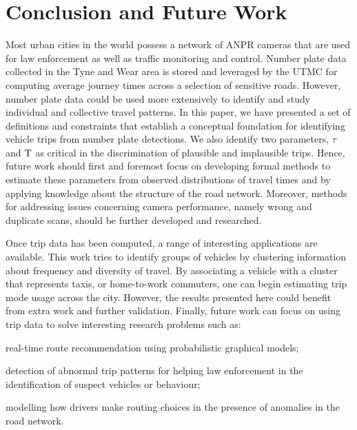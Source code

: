 \section{Conclusion and Future Work}\label{s.conclusions}

Most urban cities in the world possess a network of ANPR cameras that are used for law enforcement as well as traffic monitoring and control. Number plate data collected in the Tyne and Wear area is stored and leveraged by the UTMC for computing average journey times across a selection of sensitive roads. However, number plate data could be used more extensively to identify and study individual and collective travel patterns. In this paper, we have presented a set of definitions and constraints that establish a conceptual foundation for identifying vehicle trips from number plate detections. We also identify two parameters, $\tau$ and $\mathrm{T}$ as critical in the discrimination of plausible and implausible trips. Hence, future work should first and foremost focus on developing formal methods to estimate these parameters from observed distributions of travel times and by applying knowledge about the structure of the road network. Moreover, methods for addressing issues concerning camera performance, namely wrong and duplicate scans, should be further developed and researched.

Once trip data has been computed, a range of interesting applications are available. This work tries to identify groups of vehicles by clustering information about frequency and diversity of travel. By associating a vehicle with a cluster that represents taxis, or home-to-work commuters, one can begin estimating trip mode usage across the city. However, the results presented here could benefit from extra work and further validation. Finally, future work can focus on using trip data to solve interesting research problems such as:
\begin{enumerate*}[label=(\roman*)]
  \item real-time route recommendation using probabilistic graphical models;
  \item detection of abnormal trip patterns for helping law enforcement in the identification of suspect vehicles or behaviour;
  \item modelling how drivers make routing choices in the presence of anomalies in the road network.
\end{enumerate*}
